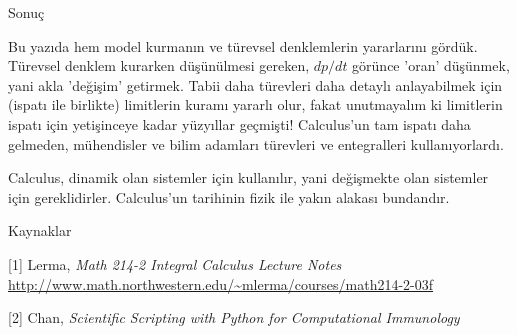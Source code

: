 \documentclass[12pt,fleqn]{article}\usepackage{../../common}
\begin{document}
Sonuç

Bu yazıda hem model kurmanın ve türevsel denklemlerin yararlarını
gördük. Türevsel denklem kurarken düşünülmesi gereken, $dp/dt$ görünce
'oran' düşünmek, yani akla 'değişim' getirmek. Tabii daha türevleri daha
detaylı anlayabilmek için (ispatı ile birlikte) limitlerin kuramı yararlı
olur, fakat unutmayalım ki limitlerin ispatı için yetişinceye kadar
yüzyıllar geçmişti! Calculus'un tam ispatı daha gelmeden, mühendisler ve
bilim adamları türevleri ve entegralleri kullanıyorlardı.

Calculus, dinamik olan sistemler için kullanılır, yani değişmekte olan
sistemler için gereklidirler. Calculus'un tarihinin fizik ile yakın alakası
bundandır.

Kaynaklar

[1] Lerma, {\em Math 214-2 Integral Calculus Lecture Notes} \url{http://www.math.northwestern.edu/~mlerma/courses/math214-2-03f}

[2] Chan, {\em Scientific Scripting with Python for Computational Immunology}
\end{document}
